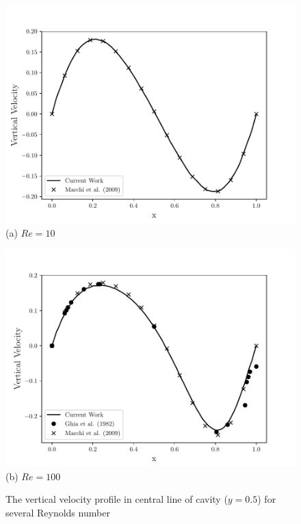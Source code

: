 \begin{figure}[H]
     \caption{The vertical velocity profile in central line of cavity ($y=0.5$) for several Reynolds number}
     \centering
     \begin{minipage}{.5\linewidth}
      \centering
      \includegraphics[scale=0.53]{./02_chaps/cap_validation/figure/Re_10_v_profile.pdf}\\
      (a) $Re=10$
     \end{minipage}%
     \begin{minipage}{.5\linewidth}
      \centering
      \includegraphics[scale=0.53]{./02_chaps/cap_validation/figure/Re_100_v_profile.pdf}\\
      (b) $Re=100$
     \end{minipage}

\end{figure}
